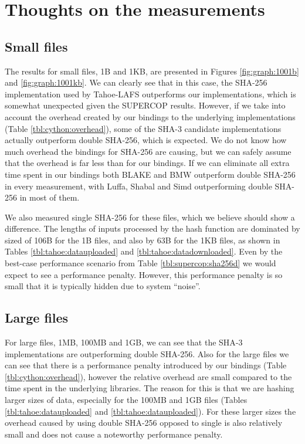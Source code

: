 \documentclass[english,12pt,a4paper]{book}
\begin{document}
\section{Thoughts on the measurements}

\subsection{Small files}

The results for small files, 1B and 1KB, are presented in Figures
\ref{fig:graph:1001b} and \ref{fig:graph:1001kb}. We can clearly see that in
this case, the \ac{SHA}-256 implementation used by Tahoe-\ac{LAFS} outperforms
our implementations, which is somewhat unexpected given the \ac{SUPERCOP}
results. However, if we take into account the overhead created by our bindings
to the underlying implementations (Table \ref{tbl:cython:overhead}), some of the
\ac{SHA}-3 candidate implementations actually outperform double \ac{SHA}-256,
which is expected. We do not know how much overhead the bindings for
\ac{SHA}-256 are causing, but we can safely assume that the overhead is far less
than for our bindings. If we can eliminate all extra time spent in our bindings
both BLAKE and \ac{BMW} outperform double \ac{SHA}-256 in every measurement,
with Luffa, Shabal and Simd outperforming double \ac{SHA}-256 in most of them.

We also measured single \ac{SHA}-256 for these files, which we believe should
show a difference. The lengths of inputs processed by the hash function are
dominated by sized of 106B for the 1B files, and also by 63B for the 1KB files,
as shown in Tables \ref{tbl:tahoe:datauploaded} and
\ref{tbl:tahoe:datadownloaded}. Even by the best-case performance scenario from
Table \ref{tbl:supercop:sha256d} we would expect to see a performance penalty.
However, this performance penalty is so small that it is typically hidden due to
system ``noise''.

\subsection{Large files}

For large files, 1MB, 100MB and 1GB, we can see that the \ac{SHA}-3
implementations are outperforming double \ac{SHA}-256. Also for the large files
we can see that there is a performance penalty introduced by our bindings (Table
\ref{tbl:cython:overhead}), however the relative overhead are small
compared to the time spent in the underlying libraries. The reason for
this is that we are hashing larger sizes of data, especially for the 100MB and
1GB files (Tables \ref{tbl:tahoe:datauploaded} and
\ref{tbl:tahoe:datauploaded}). For these larger sizes the overhead caused by
using double \ac{SHA}-256 opposed to single is also relatively small and does
not cause a noteworthy performance penalty.
\end{document}
